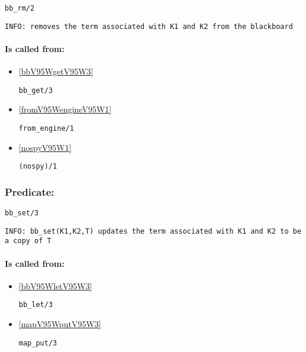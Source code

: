 \begin{verbatim}
bb_rm/2
\end{verbatim}

{\small \begin{verbatim}
INFO: removes the term associated with K1 and K2 from the blackboard

\end{verbatim}}
\paragraph{Is called from:} 
\begin{itemize}
\item \ref{bbV95WgetV95W3} 
\begin{verbatim}
bb_get/3
\end{verbatim}

\item \ref{fromV95WengineV95W1} 
\begin{verbatim}
from_engine/1
\end{verbatim}

\item \ref{nospyV95W1} 
\begin{verbatim}
(nospy)/1
\end{verbatim}

\end{itemize}

\subsubsection{Predicate:} \label{bbV95WsetV95W3}

\begin{verbatim}
bb_set/3
\end{verbatim}

{\small \begin{verbatim}
INFO: bb_set(K1,K2,T) updates the term associated with K1 and K2 to be a copy of T

\end{verbatim}}
\paragraph{Is called from:} 
\begin{itemize}
\item \ref{bbV95WletV95W3} 
\begin{verbatim}
bb_let/3
\end{verbatim}

\item \ref{mapV95WputV95W3} 
\begin{verbatim}
map_put/3
\end{verbatim}

\end{itemize}

